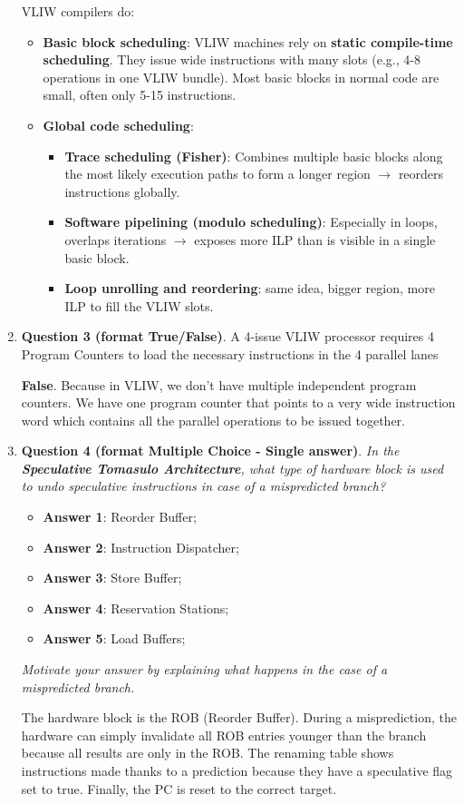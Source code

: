 \begin{enumerate}
    \newpage

    VLIW compilers do:
    \begin{itemize}
        \item \textbf{Basic block scheduling}: VLIW machines rely on \textbf{static compile-time scheduling}. They issue wide instructions with many slots (e.g., 4-8 operations in one VLIW bundle). Most basic blocks in normal code are small, often only 5-15 instructions.
        \item \textbf{Global code scheduling}:
        \begin{itemize}
            \item \textbf{Trace scheduling (Fisher)}: Combines multiple basic blocks along the most likely execution paths to form a longer region $\rightarrow$ reorders instructions globally.
            \item \textbf{Software pipelining (modulo scheduling)}: Especially in loops, overlaps iterations $\rightarrow$ exposes more ILP than is visible in a single basic block.
            \item \textbf{Loop unrolling and reordering}: same idea, bigger region, more ILP to fill the VLIW slots.
        \end{itemize}
    \end{itemize}


    \item \textbf{Question 3 (format True/False)}. A 4-issue VLIW processor requires 4 Program Counters to load the necessary instructions in the 4 parallel lanes
    
    \answer \textbf{False}. Because in VLIW, we don't have multiple independent program counters. We have one program counter that points to a very wide instruction word which contains all the parallel operations to be issued together.


    \item \textbf{Question 4 (format Multiple Choice - Single answer)}. \emph{In the \textbf{Speculative Tomasulo Architecture}, what type of hardware block is used to undo speculative instructions in case of a mispredicted branch?}
    \begin{itemize}[label=\textcolor{Red2}{}]
        \item[\textcolor{Green3}{\faIcon{check}}] \textbf{Answer 1}: Reorder Buffer;
        \item \textbf{Answer 2}: Instruction Dispatcher;
        \item \textbf{Answer 3}: Store Buffer;
        \item \textbf{Answer 4}: Reservation Stations;
        \item \textbf{Answer 5}: Load Buffers;
    \end{itemize}
    \emph{Motivate your answer by explaining what happens in the case of a mispredicted branch.}

    \answer The hardware block is the ROB (Reorder Buffer). During a misprediction, the hardware can simply invalidate all ROB entries younger than the branch because all results are only in the ROB. The renaming table shows instructions made thanks to a prediction because they have a speculative flag set to true. Finally, the PC is reset to the correct target.
\end{enumerate}
